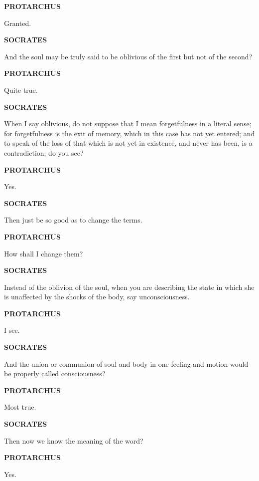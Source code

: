 \documentclass[11pt,letter]{article}
\begin{document}
\par \textbf{PROTARCHUS}
\par   Granted.

\par \textbf{SOCRATES}
\par   And the soul may be truly said to be oblivious of the first but not of the second?

\par \textbf{PROTARCHUS}
\par   Quite true.

\par \textbf{SOCRATES}
\par   When I say oblivious, do not suppose that I mean forgetfulness in a literal sense; for forgetfulness is the exit of memory, which in this case has not yet entered; and to speak of the loss of that which is not yet in existence, and never has been, is a contradiction; do you see?

\par \textbf{PROTARCHUS}
\par   Yes.

\par \textbf{SOCRATES}
\par   Then just be so good as to change the terms.

\par \textbf{PROTARCHUS}
\par   How shall I change them?

\par \textbf{SOCRATES}
\par   Instead of the oblivion of the soul, when you are describing the state in which she is unaffected by the shocks of the body, say unconsciousness.

\par \textbf{PROTARCHUS}
\par   I see.

\par \textbf{SOCRATES}
\par   And the union or communion of soul and body in one feeling and motion would be properly called consciousness?

\par \textbf{PROTARCHUS}
\par   Most true.

\par \textbf{SOCRATES}
\par   Then now we know the meaning of the word?

\par \textbf{PROTARCHUS}
\par   Yes.
\end{document}
